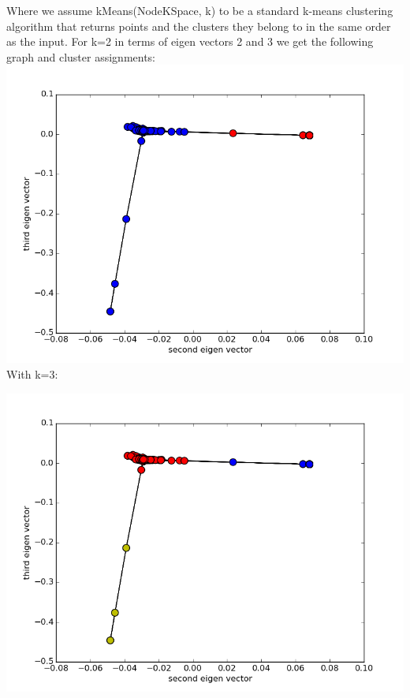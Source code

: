 \documentclass[10pt,twocolumn]{article}
\begin{document}
Where we assume kMeans(NodeKSpace, k) to be a standard k-means clustering algorithm that returns points and the clusters they belong to in the same order as the input.  For k=2 in terms of eigen vectors 2 and 3 we get the following graph and cluster assignments:
\includegraphics[scale=0.4]{pics/se.png}
With k=3:

\includegraphics[scale=0.4]{pics/s.png}
\end{document}
